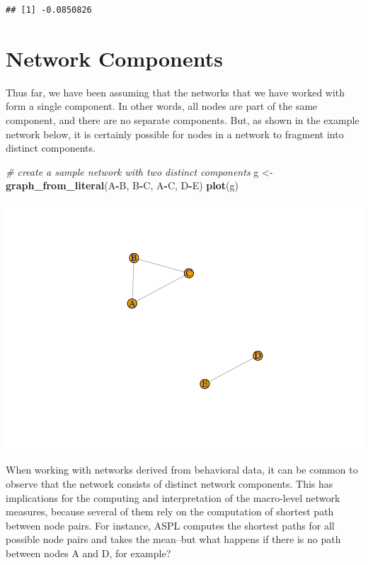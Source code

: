 \documentclass[
]{book}
\newenvironment{Shaded}{\begin{snugshade}}{\end{snugshade}}
\newcommand{\CommentTok}[1]{\textcolor[rgb]{0.56,0.35,0.01}{\textit{#1}}}
\newcommand{\FunctionTok}[1]{\textcolor[rgb]{0.13,0.29,0.53}{\textbf{#1}}}
\newcommand{\NormalTok}[1]{#1}
\newcommand{\OtherTok}[1]{\textcolor[rgb]{0.56,0.35,0.01}{#1}}
\newcommand{\SpecialCharTok}[1]{\textcolor[rgb]{0.81,0.36,0.00}{\textbf{#1}}}
\begin{document}
\begin{verbatim}
## [1] -0.0850826
\end{verbatim}

\section{Network Components}\label{network-components}

Thus far, we have been assuming that the networks that we have worked with form a single component. In other words, all nodes are part of the same component, and there are no separate components. But, as shown in the example network below, it is certainly possible for nodes in a network to fragment into distinct components.

\begin{Shaded}
\begin{Highlighting}[]
\CommentTok{\# create a sample network with two distinct components }
\NormalTok{g }\OtherTok{\textless{}{-}} \FunctionTok{graph\_from\_literal}\NormalTok{(A}\SpecialCharTok{{-}}\NormalTok{B, B}\SpecialCharTok{{-}}\NormalTok{C, A}\SpecialCharTok{{-}}\NormalTok{C, D}\SpecialCharTok{{-}}\NormalTok{E)}
\FunctionTok{plot}\NormalTok{(g)}
\end{Highlighting}
\end{Shaded}

\includegraphics{bookdown-demo_files/figure-latex/unnamed-chunk-110-1.pdf}

When working with networks derived from behavioral data, it can be common to observe that the network consists of distinct network components. This has implications for the computing and interpretation of the macro-level network measures, because several of them rely on the computation of shortest path between node pairs. For instance, ASPL computes the shortest paths for all possible node pairs and takes the mean--but what happens if there is no path between nodes A and D, for example?
\end{document}

